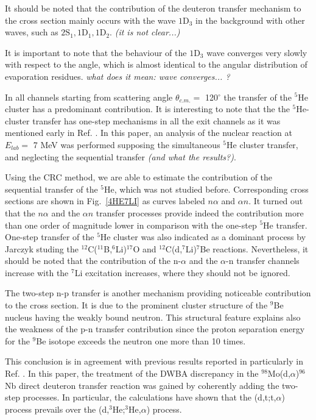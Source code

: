 \documentclass[10pt]{iopart}
\begin{document}
It should be noted that the contribution of the deuteron transfer mechanism to the cross section mainly occurs with the wave ${1\textrm{D}_3}$ in the background with other waves, such as ${2\textrm{S}_1}, 1\textrm{D}_1, 1\textrm{D}_2$. \textit{(it is not clear...)}

It is important to note that the behaviour of the ${1\textrm{D}_3}$ wave converges very slowly with respect to the angle, which is almost identical to the angular distribution of evaporation residues. \textit{what does it mean: wave converges... ?}

In all channels starting from scattering angle $\theta_{c.m.} =$ 120$^\circ$ the transfer of the ${}^5$He cluster has a predominant contribution. It is interesting to note that the the ${}^5$He-cluster transfer has one-step mechanisms in all the exit channels as it was mentioned early in Ref. \cite{bodek1989}. In this paper, an analysis of the nuclear reaction at $E_{lab} =$ 7 MeV was performed supposing the simultaneous ${}^5$He cluster transfer, and neglecting the sequential transfer \textit{(and what the results?)}.

Using the CRC method, we are able to estimate the contribution of the sequential transfer of the ${}^5$He, which was not studied before. Corresponding cross sections are shown in Fig.~\ref{4HE7LI} as curves labeled $n\alpha$ and $\alpha n$. It turned out that the $n\alpha$ and the $\alpha n$ transfer processes provide indeed the contribution more than one order of magnitude lower in comparison with the one-step ${}^5$He transfer. One-step transfer of the ${}^5$He cluster was also indicated as a dominant process by Jarczyk \etal \cite{jarczyk1996} studing the ${}^{12}$C(${}^{11}$B,${}^6$Li)${}^{17}$O and ${}^{12}$C(d,${}^7$Li)${}^{7}$Be reactions. Nevertheless, it should be noted that the contribution of the n-$\alpha$ and the $\alpha$-n transfer channels increase with the ${}^7$Li excitation increases, where they should not be ignored.

The two-step n-p transfer is another mechanism providing noticeable contribution to the cross section. It is due to the prominent cluster structure of the ${}^9$Be nucleus having the weakly bound neutron. This structural feature explains also the weakness of the p-n transfer contribution since the proton separation energy for the ${}^9$Be isotope exceeds the neutron one more than 10 times. 

This conclusion is in agreement with previous results reported in particularly in Ref. \cite{coker1974}. In this paper, the treatment of the DWBA discrepancy in the ${}^{98}$Mo(d,$\alpha$)${}^{96}$Nb direct deuteron transfer reaction was gained by coherently adding the two-step processes. In particular, the calculations have shown that the (d,t;t,$\alpha$) process prevails over the (d,${}^3$He;${}^3$He,$\alpha$) process.
\end{document}
